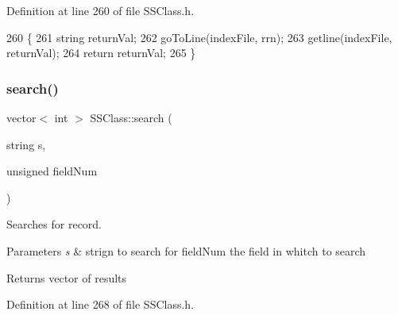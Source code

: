 Definition at line 260 of file S\+S\+Class.\+h.


\begin{DoxyCode}
260                                   \{
261     \textcolor{keywordtype}{string} returnVal;
262     goToLine(indexFile, rrn);
263     getline(indexFile, returnVal);
264     \textcolor{keywordflow}{return} returnVal;
265 \}
\end{DoxyCode}
\mbox{\label{classSSClass_a9df3598c000a6a5e9ef994d19196e69f}} 
\subsubsection{\texorpdfstring{search()}{search()}}
{\footnotesize\ttfamily vector$<$ int $>$ S\+S\+Class\+::search (\begin{DoxyParamCaption}\item[{string}]{s,  }\item[{unsigned}]{field\+Num }\end{DoxyParamCaption})}



Searches for record. 


\begin{DoxyParams}{Parameters}
{\em s} & strign to search for  field\+Num the field in whitch to search \\
\hline
\end{DoxyParams}
\begin{DoxyReturn}{Returns}
vector of results 
\end{DoxyReturn}


Definition at line 268 of file S\+S\+Class.\+h.


